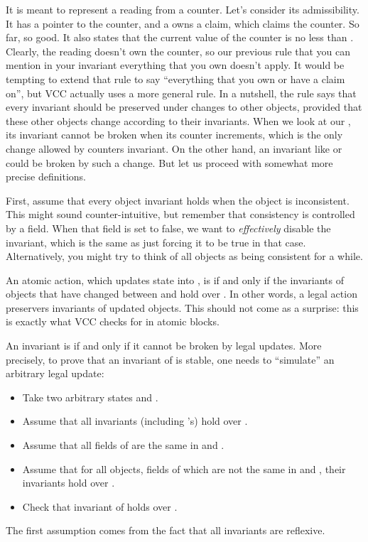 \noindent 
It is meant to represent a reading from a counter.
Let's consider its admissibility.
It has a pointer to the counter, and a owns a claim, which
claims the counter.
So far, so good.
It also states that the current value of the counter is no less than .
Clearly, the reading doesn't own the counter, so our previous rule
that you can mention in your invariant everything that you own doesn't apply.
It would be tempting to extend that rule to say ``everything that you own
or have a claim on'', but VCC actually uses a more general rule.
In a nutshell, the rule says that every invariant should be preserved
under changes to other objects, provided that these other objects change
according to their invariants.
When we look at our , its invariant cannot be broken when
its counter increments, which is the only change allowed by counters invariant.
On the other hand, an invariant like  or 
could be broken by such a change.
But let us proceed with somewhat more precise definitions.

First, assume that every object invariant holds when the object is inconsistent.
This might sound counter-intuitive, but remember that consistency is controlled
by a field.
When that field is set to false, we want to \emph{effectively} disable the invariant,
which is the same as just forcing it to be true in that case.
Alternatively, you might try to think of all objects as being consistent for a while.

An atomic action, which updates state  into , is  if and only if the invariants of
objects that have changed between  and  hold over .
In other words, a legal action preservers invariants of updated objects.
This should not come as a surprise: this is exactly what VCC checks
for in atomic blocks.

An invariant is  if and only if it cannot be broken by legal updates.
More precisely, to prove that an invariant of  is stable,
one needs to ``simulate'' an arbitrary legal update:
\begin{itemize}
\item Take two arbitrary states  and .
\item Assume that all invariants (including 's) hold over .
\item Assume that all fields of  are the same in  and .
\item Assume that for all objects, fields of which are not the same in  and ,
their invariants hold over .
\item Check that invariant of  holds over .
\end{itemize}
The first assumption comes from the fact that all invariants are reflexive.

